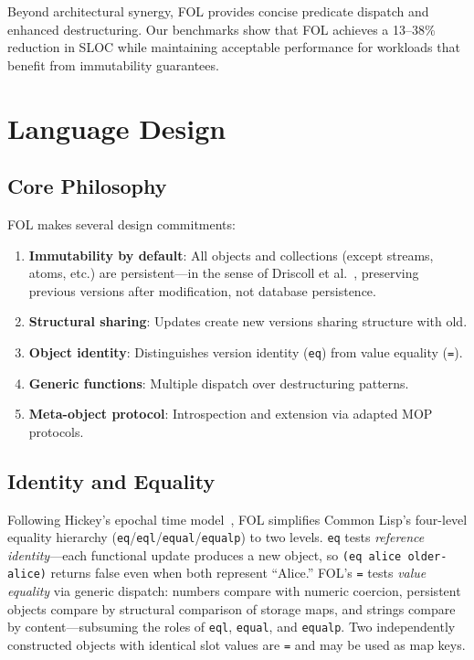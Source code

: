 \documentclass[sigconf,nonacm,review]{acmart}
\begin{document}
Beyond architectural synergy, FOL provides concise predicate dispatch and enhanced destructuring. Our benchmarks show that FOL achieves a 13--38\% reduction in SLOC while maintaining acceptable performance for workloads that benefit from immutability guarantees.

\section{Language Design}

\subsection{Core Philosophy}

FOL makes several design commitments:

\begin{enumerate}
\item \textbf{Immutability by default}: All objects and collections (except streams, atoms, etc.) are persistent---in the sense of Driscoll et al.~\cite{Driscoll1989}, preserving previous versions after modification, not database persistence.
\item \textbf{Structural sharing}: Updates create new versions sharing structure with old.
\item \textbf{Object identity}: Distinguishes version identity (\texttt{eq}) from value equality (\texttt{=}).
\item \textbf{Generic functions}: Multiple dispatch over destructuring patterns.
\item \textbf{Meta-object protocol}: Introspection and extension via adapted MOP protocols.
\end{enumerate}

\subsection{Identity and Equality}

Following Hickey's epochal time model~\cite{Hickey2009}, FOL simplifies Common Lisp's four-level equality hierarchy (\texttt{eq}/\texttt{eql}/\texttt{equal}/\texttt{equalp}) to two levels. \texttt{eq} tests \textit{reference identity}---each functional update produces a new object, so \texttt{(eq alice older-alice)} returns false even when both represent ``Alice.'' FOL's \texttt{=} tests \textit{value equality} via generic dispatch: numbers compare with numeric coercion, persistent objects compare by structural comparison of storage maps, and strings compare by content---subsuming the roles of \texttt{eql}, \texttt{equal}, and \texttt{equalp}. Two independently constructed objects with identical slot values are \texttt{=} and may be used as map keys.
\end{document}
